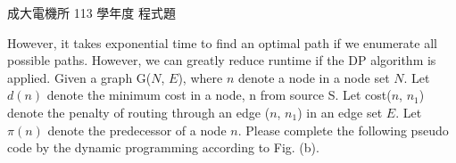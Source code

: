 \begin{pastexam}[label={px:ncku-113-ee-19}]{成大電機所 113 學年度 程式題}
\begin{enumerate}[label=\alph*.]
However, it takes exponential time to find an optimal path if we enumerate all possible paths.
However, we can greatly reduce runtime if the DP algorithm is applied. Given a graph G($N$, $E$),
where $n$ denote a node in a node set $N$. Let $d(n)$ denote the minimum cost in a node, n from
source S. Let cost($n$, $n_1$) denote the penalty of routing through an edge ($n$, $n_1$) in an
edge set $E$. Let $\pi(n)$ denote the predecessor of a node $n$. Please complete the following
pseudo code by the dynamic programming according to Fig. (b).

\begin{center}
\small
{}
\end{center}
\end{enumerate}
\end{pastexam}

